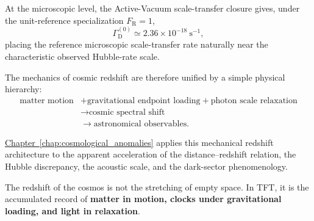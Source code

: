 At the microscopic level, the Active-Vacuum scale-transfer closure gives, under the unit-reference specialization $F_{\mathrm R}=1$,
\begin{equation}
    \Gamma_{\mathrm D}^{(0)}
    \simeq
    2.36\times10^{-18}\ \mathrm{s}^{-1},
\end{equation}
placing the reference microscopic scale-transfer rate naturally near the characteristic observed Hubble-rate scale.

The mechanics of cosmic redshift are therefore unified by a simple physical hierarchy:
\begin{equation}
\begin{aligned}
    \text{matter motion}
    &+
    \text{gravitational endpoint loading}
    +
    \text{photon scale relaxation}
    \\
    &\longrightarrow
    \text{cosmic spectral shift}
    \\
    &\longrightarrow
    \text{astronomical observables}.
\end{aligned}
\end{equation}

\hyperref[chap:cosmological_anomalies]{Chapter~\ref*{chap:cosmological_anomalies}}
applies this mechanical redshift architecture to the apparent acceleration of the distance--redshift relation, the Hubble discrepancy, the acoustic scale, and the dark-sector phenomenology.

The redshift of the cosmos is not the stretching of empty space. In TFT, it is the accumulated record of \textbf{matter in motion, clocks under gravitational loading, and light in relaxation}.
